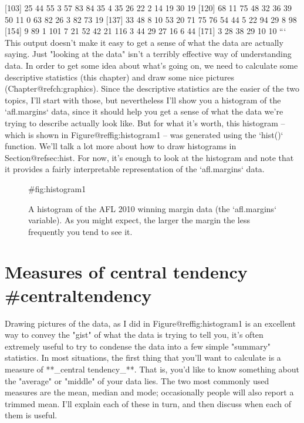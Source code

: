 [103]  25  44  55   3  57  83  84  35   4  35  26  22   2  14  19  30  19
[120]  68  11  75  48  32  36  39  50  11   0  63  82  26   3  82  73  19
[137]  33  48   8  10  53  20  71  75  76  54  44   5  22  94  29   8  98
[154]   9  89   1 101   7  21  52  42  21 116   3  44  29  27  16   6  44
[171]   3  28  38  29  10  10
```
This output doesn't make it easy to get a sense of what the data are actually saying. Just "looking at the data" isn't a terribly effective way of understanding data. In order to get some idea about what's going on, we need to calculate some descriptive statistics (this chapter) and draw some nice pictures (Chapter@refch:graphics). Since the descriptive statistics are the easier of the two topics, I'll start with those, but nevertheless I'll show you a histogram of the `afl.margins` data, since it should help you get a sense of what the data we're trying to describe actually look like. But for what it's worth, this histogram -- which is shown in Figure@reffig:histogram1 -- was generated using the `hist()` function. We'll talk a lot more about how to draw histograms in Section@refsec:hist. For now, it's enough to look at the histogram and note that it provides a fairly interpretable representation of the `afl.margins` data.

\begin{figure}[t]
\begin{center}
\caption{A histogram of the AFL 2010 winning margin data (the `afl.margins` variable). As you might expect, the larger the margin the less frequently you tend to see it.}
{#fig:histogram1}
\HR
\end{center}
\end{figure}


\section{Measures of central tendency {#centraltendency}}

Drawing pictures of the data, as I did in Figure@reffig:histogram1 is an excellent way to convey the "gist" of what the data is trying to tell you, it's often extremely useful to try to condense the data into a few simple "summary" statistics. In most situations, the first thing that you'll want to calculate is a measure of **_central tendency_**. That is, you'd like to know something about the "average" or "middle" of your data lies. The two most commonly used measures are the mean, median and mode; occasionally people will also report a trimmed mean. I'll explain each of these in turn, and then discuss when each of them is useful.

